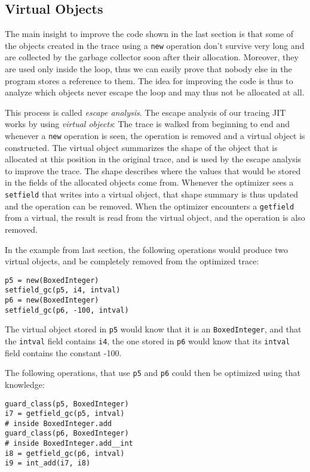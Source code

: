 \documentclass{sigplanconf}
\begin{document}
\subsection{Virtual Objects}

The main insight to improve the code shown in the last section is that some of
the objects created in the trace using a \texttt{new} operation don't survive very
long and are collected by the garbage collector soon after their allocation.
Moreover, they are used only inside the loop, thus we can easily prove that
nobody else in the program stores a reference to them. The
idea for improving the code is thus to analyze which objects never escape the
loop and may thus not be allocated at all.

This process is called \emph{escape analysis}. The escape analysis of
our tracing JIT works by using \emph{virtual objects}: The trace is walked from
beginning to end and whenever a \texttt{new} operation is seen, the operation is
removed and a virtual object is constructed. The virtual object summarizes the
shape of the object that is allocated at this position in the original trace,
and is used by the escape analysis to improve the trace. The shape describes
where the values that would be stored in the fields of the allocated objects
come from. Whenever the optimizer sees a \texttt{setfield} that writes into a virtual
object, that shape summary is thus updated and the operation can be removed.
When the optimizer encounters a \texttt{getfield} from a virtual, the result is read
from the virtual object, and the operation is also removed.

In the example from last section, the following operations would produce two
virtual objects, and be completely removed from the optimized trace:

\begin{verbatim}
p5 = new(BoxedInteger)
setfield_gc(p5, i4, intval)
p6 = new(BoxedInteger)
setfield_gc(p6, -100, intval)
\end{verbatim}


The virtual object stored in \texttt{p5} would know that it is an \texttt{BoxedInteger}, and that
the \texttt{intval} field contains \texttt{i4}, the one stored in \texttt{p6} would know that
its \texttt{intval} field contains the constant -100.

The following operations, that use \texttt{p5} and \texttt{p6} could then be
optimized using that knowledge:

\begin{verbatim}
guard_class(p5, BoxedInteger)
i7 = getfield_gc(p5, intval)
# inside BoxedInteger.add
guard_class(p6, BoxedInteger)
# inside BoxedInteger.add__int
i8 = getfield_gc(p6, intval)
i9 = int_add(i7, i8)
\end{verbatim}
\end{document}
